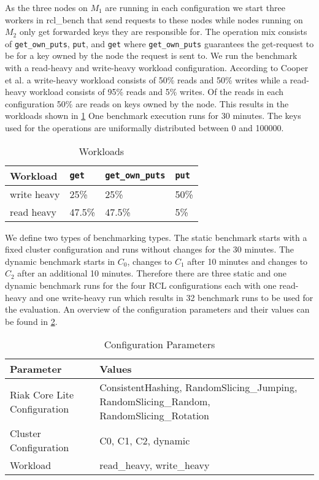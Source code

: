 As the three nodes on $M_1$ are running in each configuration we start three workers in rcl\_bench that send requests to these nodes while nodes running on $M_2$ only get forwarded keys they are responsible for.
The operation mix consists of \lstinline!get_own_puts!, \lstinline!put!, and \lstinline!get! where \lstinline!get_own_puts! guarantees the get-request to be for a key owned by the node the request is sent to.
We run the benchmark with a read-heavy and write-heavy workload configuration.
According to Cooper et al.\cite{Cooper2010} a write-heavy workload consists of 50\% reads and 50\% writes while a read-heavy workload consists of 95\% reads and 5\% writes.
Of the reads in each configuration 50\% are reads on keys owned by the node.
This results in the workloads shown in \cref{tab:workloads}
One benchmark execution runs for 30 minutes.
The keys used for the operations are uniformally distributed between 0 and 100000.
\begin{table}
\begin{tabularx}{\textwidth}{|l|X|X|X|}
\hline
Workload & \lstinline!get! & \lstinline!get_own_puts! & \lstinline!put!\\\hline
write heavy & 25\% & 25\% & 50\%\\
read heavy & 47.5\% & 47.5\% & 5\%\\\hline
\end{tabularx}
\caption[Workloads]{Workloads}
\label{tab:workloads}
\end{table}

We define two types of benchmarking types.
The static benchmark starts with a fixed cluster configuration and runs without changes for the 30 minutes.
The dynamic benchmark starts in $C_0$, changes to $C_1$ after 10 minutes and changes to $C_2$ after an additional 10 minutes.
Therefore there are three static and one dynamic benchmark runs for the four \ac{RCL} configurations each with one read-heavy and one write-heavy run which results in 32 benchmark runs to be used for the evaluation.
An overview of the configuration parameters and their values can be found in \cref{tab:configurations}.
\begin{table}
\begin{tabularx}{\textwidth}{|l|X|}
\hline
Parameter & Values\\\hline
Riak Core Lite Configuration & ConsistentHashing, RandomSlicing\_Jumping, RandomSlicing\_Random, RandomSlicing\_Rotation\\
Cluster Configuration & C0, C1, C2, dynamic\\
Workload & read\_heavy, write\_heavy\\\hline
\end{tabularx}
\caption[Configuration Parameters]{Configuration Parameters}
\label{tab:configurations}
\end{table}


